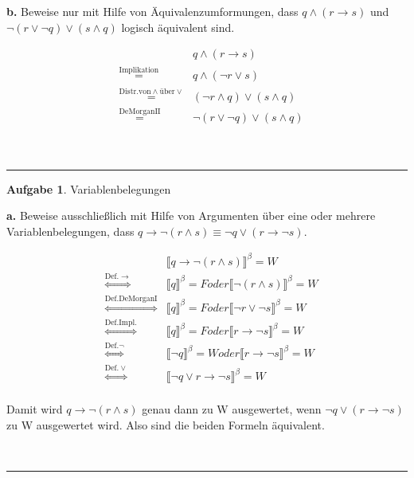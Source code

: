 \documentclass[10pt,leqno ]{article}
\newcommand\customeq[1]{\overset{\mathrm{#1}}{=}}
\newcommand\customarroweq[1]{\overset{\mathrm{#1}}{\Leftrightarrow}}
\theoremstyle{definition}
\newtheorem{problem}[theorem]{Aufgabe}
\newenvironment{solution}[1][L]{\begin{doublespace}\textbf{#1.}\quad }{\ \rule{0.5em}{0.5em}\end{doublespace}}
\begin{document}
\begin{solution}[b]
Beweise nur mit Hilfe von Äquivalenzumformungen, dass \( q \land (r \rightarrow s) \) und \( \lnot(r \lor \lnot q) \lor (s \land q) \) logisch äquivalent sind.    

\begin{equation*}
    \begin{aligned}
    & & q \land (r \rightarrow s) \\
    & \customeq{Implikation} & q \land (\lnot r \lor s)  \\
    & \customeq{Distr. von \land \textrm{über} \lor} & (\lnot r \land q) \lor (s \land q) \\
    & \customeq{De Morgan II} & \lnot(r \lor \lnot q) \lor (s \land q) \\
    \end{aligned}
\end{equation*}

\end{solution}


\begin{problem}
    Variablenbelegungen
\end{problem}

\begin{solution}[a]
Beweise ausschließlich mit Hilfe von Argumenten über eine oder mehrere Variablenbelegungen, dass \( q \rightarrow \lnot (r \land s) \equiv \lnot q \lor (r \rightarrow \lnot s) \).

\begin{equation*}
    \begin{aligned}
    & & \llbracket q \rightarrow \lnot (r \land s) \rrbracket ^ \beta = W \\
    & \customarroweq{Def. \rightarrow} & \llbracket q \rrbracket ^ \beta = F oder \llbracket \lnot (r \land s) \rrbracket ^ \beta = W  \\
    & \customarroweq{Def. De Morgan I} & \llbracket q \rrbracket ^ \beta = F oder \llbracket \lnot r \lor \lnot s \rrbracket ^ \beta = W  \\
    & \customarroweq{Def. Impl.} & \llbracket q \rrbracket ^ \beta = F oder \llbracket r \rightarrow \lnot s \rrbracket ^ \beta = W  \\
    & \customarroweq{Def. \lnot} & \llbracket \lnot q \rrbracket ^ \beta = W oder \llbracket r \rightarrow \lnot s \rrbracket ^ \beta = W  \\
    & \customarroweq{Def. \lor} & \llbracket \lnot q \lor r \rightarrow \lnot s \rrbracket ^ \beta = W  \\
    \end{aligned}
\end{equation*}

Damit wird \( q \rightarrow \lnot (r \land s) \) genau dann zu W ausgewertet, wenn \( \lnot q \lor (r \rightarrow \lnot s) \) zu W ausgewertet wird.
Also sind die beiden Formeln äquivalent.

\end{solution}
    
\end{document}
